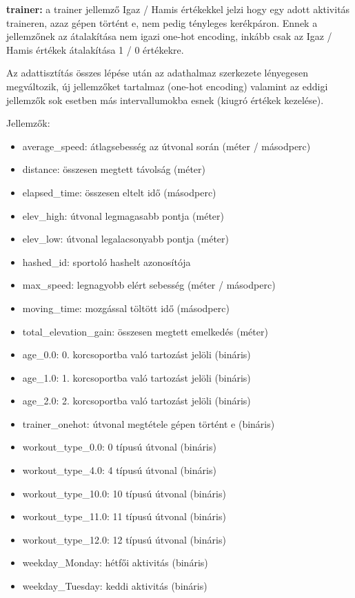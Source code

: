 \textbf{trainer: } a trainer jellemző Igaz / Hamis értékekkel jelzi hogy egy adott aktivitás traineren, azaz gépen történt e, nem pedig tényleges kerékpáron. Ennek a jellemzőnek az átalakítása nem igazi one-hot encoding, inkább csak az Igaz / Hamis értékek átalakítása 1 / 0 értékekre.  


Az adattisztítás összes lépése után az adathalmaz szerkezete lényegesen megváltozik, új jellemzőket tartalmaz (one-hot encoding) valamint az eddigi jellemzők sok esetben más intervallumokba esnek (kiugró értékek kezelése).

Jellemzők:
\begin{itemize}
	\item average\_speed: átlagsebesség az útvonal során (méter / másodperc)
	\item distance: összesen megtett távolság (méter)
	\item elapsed\_time: összesen eltelt idő (másodperc)
	\item elev\_high: útvonal legmagasabb pontja (méter)
	\item elev\_low: útvonal legalacsonyabb pontja (méter)
	\item hashed\_id: sportoló hashelt azonosítója
	\item max\_speed: legnagyobb elért sebesség (méter / másodperc)
	\item moving\_time: mozgással töltött idő (másodperc)
	\item total\_elevation\_gain: összesen megtett emelkedés (méter)
	\item age\_0.0: 0. korcsoportba való tartozást jelöli (bináris)
	\item age\_1.0: 1. korcsoportba való tartozást jelöli (bináris)
	\item age\_2.0: 2. korcsoportba való tartozást jelöli (bináris)
	\item trainer\_onehot: útvonal megtétele gépen történt e (bináris)
	\item workout\_type\_0.0: 0 típusú útvonal (bináris)
	\item workout\_type\_4.0: 4 típusú útvonal (bináris)
	\item workout\_type\_10.0: 10 típusú útvonal (bináris)
	\item workout\_type\_11.0: 11 típusú útvonal (bináris)
	\item workout\_type\_12.0: 12 típusú útvonal (bináris)
	\item weekday\_Monday: hétfői aktivitás (bináris)
	\item weekday\_Tuesday: keddi aktivitás (bináris)

\end{itemize}
